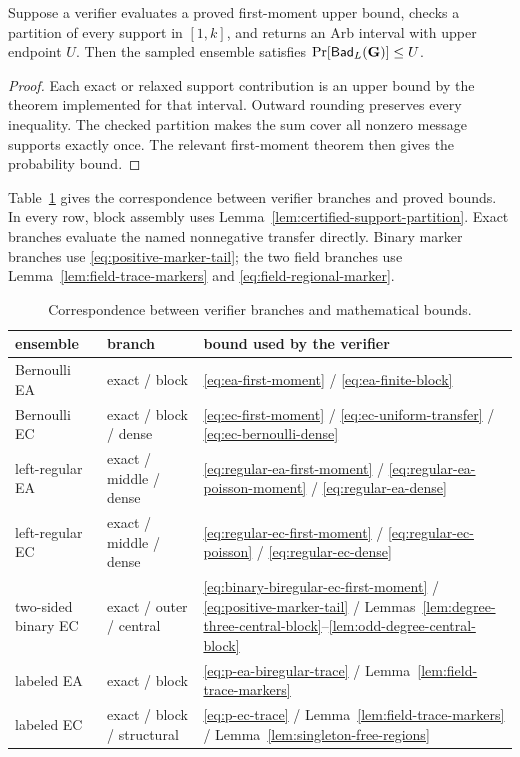 \begin{proposition}
\label{prop:certificate-soundness}
Suppose a verifier evaluates a proved first-moment upper bound, checks a
partition of every support in $[1,k]$, and returns an Arb interval with upper
endpoint $U$.  Then the sampled ensemble satisfies
$\Pr[\mathsf{Bad}_L(\mathbf G)]\leq U$.
\end{proposition}

\begin{proof}
Each exact or relaxed support contribution is an upper bound by the theorem
implemented for that interval.  Outward rounding preserves every inequality.
The checked partition makes the sum cover all nonzero message supports
exactly once.  The relevant first-moment theorem then gives the probability
bound.
\end{proof}

Table~\ref{tab:verifier-correspondence} gives the correspondence between
verifier branches and proved bounds.  In every row, block assembly uses
Lemma~\ref{lem:certified-support-partition}.  Exact branches evaluate the
named nonnegative transfer directly.  Binary marker branches use
\eqref{eq:positive-marker-tail}; the two field branches use
Lemma~\ref{lem:field-trace-markers} and \eqref{eq:field-regional-marker}.

\begin{table}[t]
\centering
\small
\caption{Correspondence between verifier branches and mathematical bounds.}
\label{tab:verifier-correspondence}
\begin{tabular}{@{}lll@{}}
\toprule
ensemble & branch & bound used by the verifier \\
\midrule
Bernoulli EA & exact / block
 & \eqref{eq:ea-first-moment} / \eqref{eq:ea-finite-block} \\
Bernoulli EC & exact / block / dense
 & \eqref{eq:ec-first-moment} / \eqref{eq:ec-uniform-transfer} /
   \eqref{eq:ec-bernoulli-dense} \\
left-regular EA & exact / middle / dense
 & \eqref{eq:regular-ea-first-moment} / \eqref{eq:regular-ea-poisson-moment} /
   \eqref{eq:regular-ea-dense} \\
left-regular EC & exact / middle / dense
 & \eqref{eq:regular-ec-first-moment} / \eqref{eq:regular-ec-poisson} /
   \eqref{eq:regular-ec-dense} \\
two-sided binary EC & exact / outer / central
 & \eqref{eq:binary-biregular-ec-first-moment} /
   \eqref{eq:positive-marker-tail} /
   Lemmas~\ref{lem:degree-three-central-block}--\ref{lem:odd-degree-central-block} \\
labeled EA & exact / block
 & \eqref{eq:p-ea-biregular-trace} / Lemma~\ref{lem:field-trace-markers} \\
labeled EC & exact / block / structural
 & \eqref{eq:p-ec-trace} / Lemma~\ref{lem:field-trace-markers} /
   Lemma~\ref{lem:singleton-free-regions} \\
\bottomrule
\end{tabular}
\end{table}

